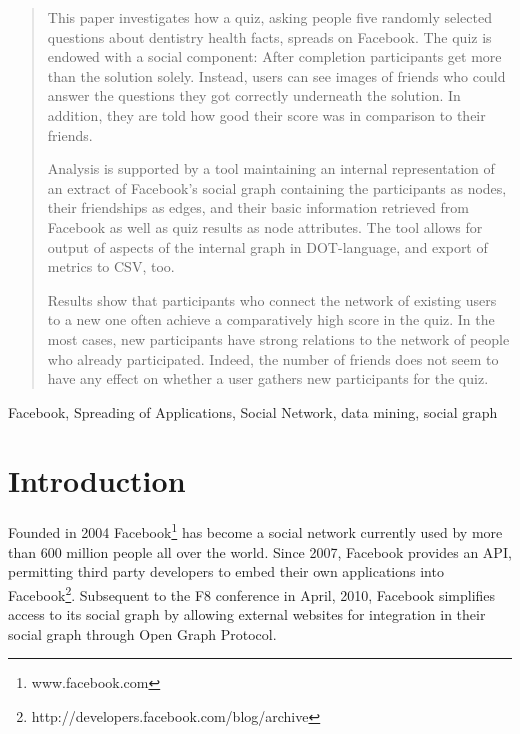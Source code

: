 \documentclass[preprint,12pt]{elsarticle}
\begin{document}
\begin{frontmatter}
\begin{abstract}
This paper investigates how a quiz, asking people five randomly
selected questions about dentistry health facts, spreads on
Facebook. The quiz is endowed with a social component: After
completion participants get more than the solution solely. Instead,
users can see images of friends who could answer the questions they got correctly
underneath the solution. In addition, they are told how good their
score was in comparison to their friends. 

Analysis is supported by a tool maintaining an internal representation
of an extract of Facebook's social graph containing the participants
as nodes, their friendships as edges, and their basic information
retrieved from Facebook as well as quiz results as node
attributes. The tool allows for output of aspects of the internal graph
in DOT-language, and export of metrics to CSV, too. 

Results show that participants who connect the network of existing
users to a new one often achieve a comparatively high score in the
quiz. In the most cases, new participants have strong relations to the network of people who
already participated. Indeed, the number of friends does not seem to
have any effect on whether a user gathers new participants for the quiz.
\end{abstract}

\begin{keyword}

Facebook, Spreading of Applications, Social Network, data mining, social graph
\end{keyword}

\end{frontmatter}



\section{Introduction}
\label{sec:introduction}
Founded in 2004 Facebook\footnote{www.facebook.com} has
become a social network currently used by more than 600 million people
all over the world\cite{facebook500}. Since 2007, Facebook provides an API, permitting
third party developers to embed their own applications into
Facebook\footnote{http://developers.facebook.com/blog/archive}.
Subsequent to the F8 conference in April, 2010, Facebook simplifies
access to its social graph by allowing
external websites for integration in their social graph through Open
Graph Protocol.\cite{facebookStats} 
\end{document}
